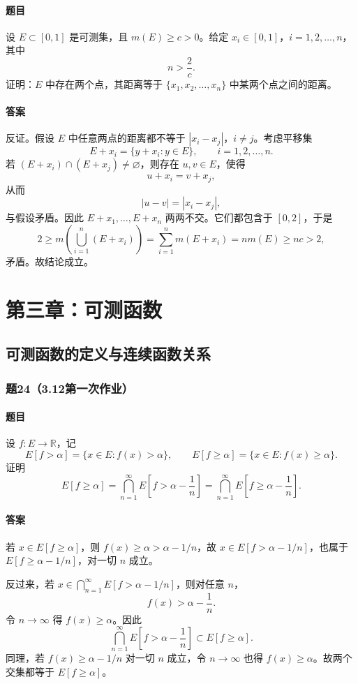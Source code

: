\documentclass{article}
\newcommand{\R}{\mathbb{R}}
\newcommand{\meas}{m}
\begin{document}
\paragraph{题目}设 $E\subset[0,1]$ 是可测集，且 $\meas(E)\ge c>0$。给定 $x_i\in[0,1]$，$i=1,2,\ldots,n$，其中
\[
n>\frac{2}{c}.
\]
证明：$E$ 中存在两个点，其距离等于 $\{x_1,x_2,\ldots,x_n\}$ 中某两个点之间的距离。

\paragraph{答案}反证。假设 $E$ 中任意两点的距离都不等于 $|x_i-x_j|$，$i\ne j$。考虑平移集
\[
E+x_i=\{y+x_i:y\in E\},\qquad i=1,2,\ldots,n.
\]
若 $(E+x_i)\cap(E+x_j)\ne\varnothing$，则存在 $u,v\in E$，使得
\[
u+x_i=v+x_j,
\]
从而
\[
|u-v|=|x_i-x_j|,
\]
与假设矛盾。因此 $E+x_1,\ldots,E+x_n$ 两两不交。它们都包含于 $[0,2]$，于是
\[
2\ge \meas\left(\bigcup_{i=1}^{n}(E+x_i)\right)
=\sum_{i=1}^{n}\meas(E+x_i)=n\meas(E)
\ge nc>2,
\]
矛盾。故结论成立。

\section{第三章：可测函数}

\subsection{可测函数的定义与连续函数关系}

\subsubsection*{题24（3.12第一次作业）}
\paragraph{题目}设 $f:E\to\R$，记
\[
E[f>\alpha]=\{x\in E:f(x)>\alpha\},
\qquad
E[f\ge\alpha]=\{x\in E:f(x)\ge\alpha\}.
\]
证明
\[
E[f\ge\alpha]=\bigcap_{n=1}^{\infty}E\left[f>\alpha-\frac1n\right]
=\bigcap_{n=1}^{\infty}E\left[f\ge\alpha-\frac1n\right].
\]

\paragraph{答案}若 $x\in E[f\ge\alpha]$，则 $f(x)\ge\alpha>\alpha-1/n$，故 $x\in E[f>\alpha-1/n]$，也属于 $E[f\ge\alpha-1/n]$，对一切 $n$ 成立。

反过来，若 $x\in\bigcap_{n=1}^{\infty}E[f>\alpha-1/n]$，则对任意 $n$，
\[
f(x)>\alpha-\frac1n.
\]
令 $n\to\infty$ 得 $f(x)\ge\alpha$。因此
\[
\bigcap_{n=1}^{\infty}E\left[f>\alpha-\frac1n\right]
\subset E[f\ge\alpha].
\]
同理，若 $f(x)\ge\alpha-1/n$ 对一切 $n$ 成立，令 $n\to\infty$ 也得 $f(x)\ge\alpha$。故两个交集都等于 $E[f\ge\alpha]$。
\end{document}
